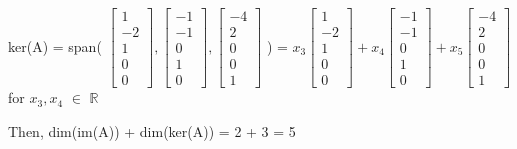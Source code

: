 \begin{tbox}
        \hspace{0.5cm}
        ker(A) = span(
        \scriptsize
        $\begin{bmatrix}
            1 \\
            -2 \\
            1 \\
            0 \\
            0
        \end{bmatrix},
        \begin{bmatrix}
            -1 \\
            -1 \\
            0 \\
            1 \\
            0
        \end{bmatrix},
        \begin{bmatrix}
            -4 \\
            2 \\
            0 \\
            0 \\
            1
        \end{bmatrix}$
        \normalsize) =
        \scriptsize
        $x_3\begin{bmatrix}
            1 \\
            -2 \\
            1 \\
            0 \\
            0
        \end{bmatrix} +
        x_4\begin{bmatrix}
            -1 \\
            -1 \\
            0 \\
            1 \\
            0
        \end{bmatrix}  +
        x_5\begin{bmatrix}
            -4 \\
            2 \\
            0 \\
            0 \\
            1
        \end{bmatrix}$
        \normalsize
        for $x_3,x_4$ $\in$ $\mathbb{R}$

        Then, dim(im(A)) + dim(ker(A))
        = 2 + 3 = 5
    \end{tbox}

